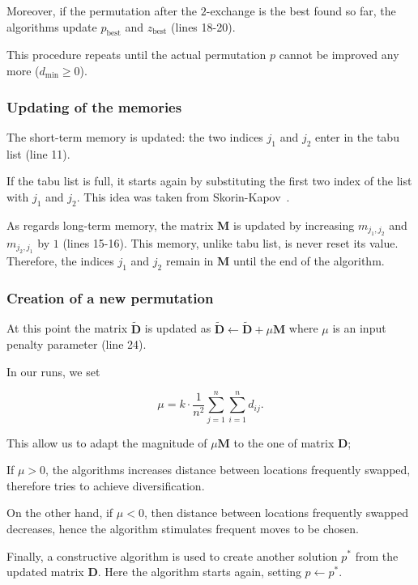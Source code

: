 Moreover, if the permutation after the $2$-exchange is the best found so far, the algorithms update $p_\mathrm{best}$ and $z_\mathrm{best}$ (lines 18-20).


This procedure repeats until the actual permutation $p$ cannot be improved any more ($d_\mathrm{min}\ge 0$).


\subsubsection{Updating of the memories}

The short-term memory is updated: the two indices $j_1$ and $j_2$ enter in the tabu list (line 11).

If the tabu list is full, it starts again by substituting the first two index of the list with $j_1$ and $j_2$.
This idea was taken from Skorin-Kapov~\cite{Skorin_Kapov_1990}.

As regards long-term memory, the matrix $\bm M$  is updated by increasing  $m_{j_1,j_2}$ and $m_{j_2,j_1}$ by $1$ (lines 15-16). This memory, unlike tabu list, is never reset its value. Therefore, the indices $j_1$ and $j_2$ remain in $\bm M$ until the end of the algorithm. 

\subsubsection{Creation of a new permutation}

 At this point  the matrix $\tilde{\bm D}$ is updated as $\tilde{\bm D} \gets \tilde{\bm D}+ \mu \bm M$ where $\mu$ is an input penalty parameter (line 24).
 
In our runs, we set 
   
   \begin{equation}
   	\label{eq:ParametroMu}\mu = k \cdot \frac{1}{n^2} \sum_{j=1}^n\sum_{i=1}^n d_{ij}.
   	\end{equation}
   
   \noindent This allow us to adapt the magnitude of $\mu \bm M$  to the one of matrix $\bm D$; 
 
  If $\mu > 0$, the algorithms increases distance between locations frequently swapped, therefore tries to achieve diversification. 
 
 On the other hand, if $\mu < 0$, then distance between locations frequently swapped decreases, hence the algorithm stimulates frequent moves to be chosen.
 


Finally, a constructive algorithm is used to create another solution $p^*$ from the updated matrix $\bm D$. Here the algorithm starts again, setting $p\gets p^*$. 


